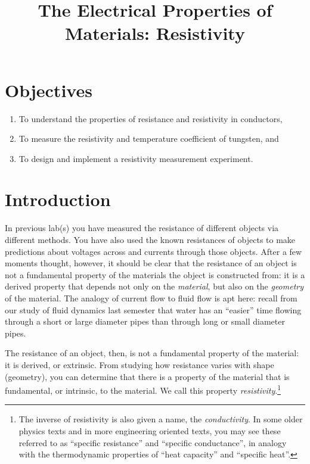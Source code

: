 \documentclass[12pt]{article}
\title{The Electrical Properties of Materials: Resistivity}
\author{}
\date{}
\begin{document}
\maketitle

\section{Objectives}
\label{sec:objectives}

\begin{enumerate}
\item To understand the properties of resistance and resistivity in
  conductors, 
\item To measure the resistivity and temperature coefficient of
  tungsten, and
\item To design and implement a resistivity measurement experiment. 
\end{enumerate}

\section{Introduction}
\label{sec:introduction}

In previous lab(s) you have measured the resistance of different
objects via different methods.  You have also used the known
resistances of objects to make predictions about voltages across and
currents through those objects.  After a few moments thought, however,
it should be clear that the resistance of an object is not a
fundamental property of the materials the object is constructed from:
it is a derived property that depends not only on the
\textit{material}, but also on the \textit{geometry} of the material.
The analogy of current flow to fluid flow is apt here: recall from our
study of fluid dynamics last semester that water has an ``easier''
time flowing through a short or large diameter pipes than through long
or small diameter pipes.

The resistance of an object, then, is not a fundamental property of
the material: it is derived, or extrinsic.  From studying how
resistance varies with shape (geometry), you can determine that there
is a property of the material that is fundamental, or intrinsic, to
the material.  We call this property
\textit{resistivity}.\footnote{The inverse of resistivity is also
  given a name, the \textit{conductivity}.  In some older physics
  texts and in more engineering oriented texts, you may see these
  referred to as ``specific resistance'' and ``specific conductance'',
  in analogy with the thermodynamic properties of ``heat capacity''
  and ``specific heat''.}
\end{document}
